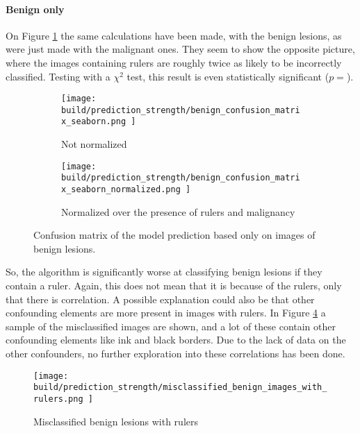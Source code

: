 \paragraph{Benign only}
On Figure \ref{fig:prediction_strength_ruler_benign} the same calculations have been made,
with the benign lesions, as were just made with the malignant ones.
They seem to show the opposite picture, where the images containing rulers are roughly
twice as likely to be incorrectly classified.
Testing with a $\chi^2$ test, this result is even statistically significant
($p=$).

\begin{figure}[h]
    \centering
    \begin{subfigure}[h]{0.45\textwidth}
        \texttt{[image: 
            build/prediction\_strength/benign\_confusion\_matrix\_seaborn.png
        ]}
        \caption{Not normalized}
        \label{fig:prediction_strength_ruler_benign}
    \end{subfigure}
    \begin{subfigure}[h]{0.45\textwidth}
        \texttt{[image: 
            build/prediction\_strength/benign\_confusion\_matrix\_seaborn\_normalized.png
        ]}
        \caption{Normalized over the presence of rulers and malignancy}
        \label{fig:prediction_strength_ruler_normalized_benign}
    \end{subfigure}
    \caption{Confusion matrix of the model prediction based only on images of benign lesions.}
\end{figure}

So, the algorithm is significantly worse at classifying benign lesions if they contain a ruler.
Again, this does not mean that it is because of the rulers, only that there is correlation.
A possible explanation could also be that other confounding elements are more present in images with rulers.
In Figure \ref{fig:prediction_strength_ruler_misclassified_benign} a sample of the misclassified images are shown,
and a lot of these contain other confounding elements like ink and black borders.
Due to the lack of data on the other confounders, no further exploration into these correlations has been done.

\begin{figure}
    \centering
    \texttt{[image: 
        build/prediction\_strength/misclassified\_benign\_images\_with\_rulers.png
    ]}
    \caption{Misclassified benign lesions with rulers}
    \label{fig:prediction_strength_ruler_misclassified_benign}
\end{figure}

